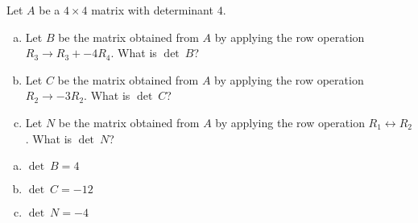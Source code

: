 
\begin{exerciseStatement}


Let \(A\) be a \(4 \times 4\) matrix with determinant \( 4 \).


\begin{enumerate}[(a)]
\item Let \(B\) be the matrix obtained from \(A\) by applying the row operation \( R_3 \to R_3 + -4R_4 \). What is \(\operatorname{det}\ B\)?
\item Let \(C\) be the matrix obtained from \(A\) by applying the row operation \( R_2 \to -3R_2 \). What is \(\operatorname{det}\ C\)?
\item Let \(N\) be the matrix obtained from \(A\) by applying the row operation \( R_1 \leftrightarrow R_2 \). What is \(\operatorname{det}\ N\)?
\end{enumerate}
    
\end{exerciseStatement}
    
\begin{exerciseAnswer} 

\begin{enumerate}[(a)]
\item \(\operatorname{det}\ B= 4 \)
\item \(\operatorname{det}\ C= -12 \)
\item \(\operatorname{det}\ N= -4 \)
\end{enumerate}
    
\end{exerciseAnswer}
    
